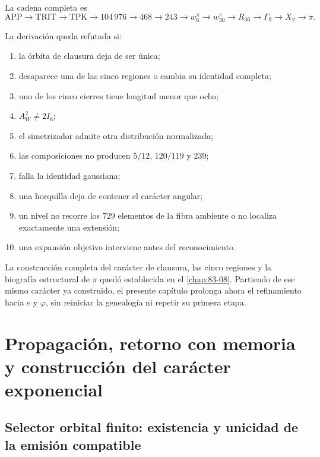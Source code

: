 La cadena completa es
\[
 \mathrm{APP}\to\mathrm{TRIT}\to\mathrm{TPK}
 \to104\,976\to468\to243\to w_6^\pi
 \to w_{30}^\pi\to R_{36}\to\Gamma_9
 \to X_\pi\to\pi.
\]

\begin{criterion}
La derivación queda refutada si:
\begin{enumerate}
 \item la órbita de clausura deja de ser única;
 \item desaparece una de las cinco regiones o cambia su identidad completa;
 \item uno de los cinco cierres tiene longitud menor que ocho;
 \item \(A_W^2\ne2I_6\);
 \item el simetrizador admite otra distribución normalizada;
 \item las composiciones no producen \(5/12\), \(120/119\) y \(239\);
 \item falla la identidad gaussiana;
 \item una horquilla deja de contener el carácter angular;
 \item un nivel no recorre los \(729\) elementos de la fibra ambiente o no
       localiza exactamente una extensión;
 \item una expansión objetivo interviene antes del reconocimiento.
\end{enumerate}
\end{criterion}
\fi

La construcción completa del carácter de clausura, las cinco regiones y la
biografía estructural de \(\pi\) quedó establecida en el
\cref{chap:83-08}. Partiendo de ese mismo carácter ya construido, el presente
capítulo prolonga ahora el refinamiento hacia \(e\) y \(\varphi\), sin
reiniciar la genealogía ni repetir su primera etapa.



\section{Propagación, retorno con memoria y construcción del carácter exponencial}
\label{p12-83-c9-s2:chap:biografia-completa-e}

\subsection{Selector orbital finito: existencia y unicidad de la emisión compatible}

